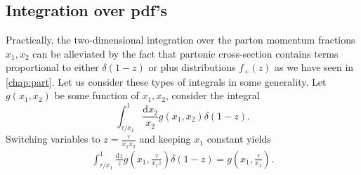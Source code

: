 \documentclass[../main.tex]{subfiles}
\begin{document}
\subsection{Integration over pdf's}
Practically, the two-dimensional integration over the parton momentum fractions \(x_1, x_2\) can be alleviated by the fact that partonic cross-section contains terms proportional to either \(\delta(1-z)\) or plus distributions \(f_+(z)\) as we have seen in \cref{chap:part}.
Let us consider these types of integrals in some generality.
Let \(g(x_1, x_2)\) be some function of \(x_1, x_2\), consider the integral
\begin{equation}
  \int_{\tau/x_1}^1 \! \frac{\mathrm{d}x_2}{x_2} g(x_1, x_2) \delta(1-z).
\end{equation}
Switching variables to \(z = \frac{\tau}{x_1 x_2}\) and keeping \(x_1\) constant yields
\begin{align}
  \int_{\tau/x_1}^1 \! \frac{\mathrm{d}z}{z}  g(x_1, \frac{\tau}{x_1 z}) \delta(1-z) = g(x_1, \frac{\tau}{x_1}).
\end{align}
\end{document}

